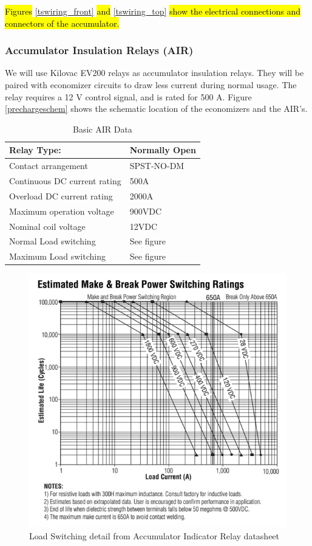 \documentclass{article}
\DeclareRobustCommand{\hlr}[1]{{\sethlcolor{red}\hl{#1}}}
\begin{document}
            \hlr{Figures} \ref{tswiring_front} \hlr{and} \ref{tswiring_top} \hlr{show the electrical connections and connectors of the accumulator. }

        \subsubsection{Accumulator Insulation Relays (AIR)} \label{airs}


            We will use Kilovac EV200 relays as accumulator insulation relays. They will be paired with economizer circuits to draw less current during normal usage. The relay requires a 12 V control signal, and is rated for 500 A. Figure \ref{prechargeschem} shows the schematic location of the economizers and the AIR's.

            \begin{table}[H]
            \centering
            \begin{tabular}{|l|l|}
            \hline
            Relay Type: & Normally Open \\ \hline
            Contact arrangement & SPST-NO-DM \\ \hline
            Continuous DC current rating & 500A \\ \hline
            Overload DC current rating & 2000A \\ \hline
            Maximum operation voltage & 900VDC \\ \hline
            Nominal coil voltage & 12VDC \\ \hline
            Normal Load switching & See figure \\ \hline
            Maximum Load switching & See figure \\ \hline
            \end{tabular}
            \caption{Basic AIR Data}
            \label{air}
            \end{table}

            \begin{figure}[H]
            \centering
            \includegraphics[width = 0.7 \textwidth]{AIRswitching}
            \caption{Load Switching detail from Accumulator Indicator Relay datasheet}
            \label{airswitch}
            \end{figure}
\end{document}
